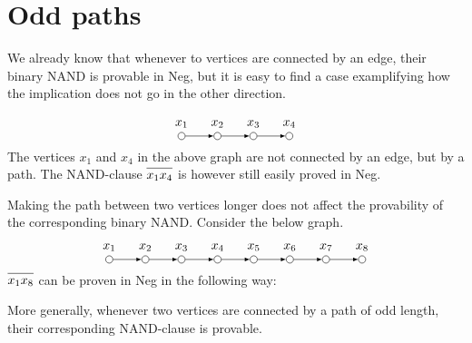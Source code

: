 \section{Odd paths}
\label{sec:Odd paths}
We already know that whenever to vertices are connected by an edge, their binary NAND is provable in Neg, but it is easy to find a case examplifying how the implication does not go in the other direction.

\[
  \begin{tikzpicture}
    [
    point/.style={circle,draw,inner sep=0pt,minimum size=2mm},
    collection/.style={thick,rectangle,draw,inner sep=0pt,minimum height=14mm, minimum width= 9mm}
    ]
    \node (1) at (0,1) [point,label=above:$x_1$] {};
    \node (2) at (1,1) [point,label=above:$x_2$] {};
    \node (3) at (2,1) [point,label=above:$x_3$] {};
    \node (4) at (3,1) [point,label=above:$x_4$] {};
    \draw [-latex] (1) to (2);
    \draw [-latex] (2) to (3);
    \draw [-latex] (3) to (4);
  \end{tikzpicture}
\]
The vertices $x_1$ and $x_4$ in the above graph are not connected by an edge, but by a path.
The NAND-clause $\ol{x_1x_4}$ is however still easily proved in Neg.
\begin{prooftree*}
\end{prooftree*}
Making the path between two vertices longer does not affect the provability of the corresponding binary NAND.
Consider the below graph.
\[
  \begin{tikzpicture}
    [
    point/.style={circle,draw,inner sep=0pt,minimum size=2mm},
    collection/.style={thick,rectangle,draw,inner sep=0pt,minimum height=14mm, minimum width= 9mm}
    ]
    \node (1) at (0,1) [point,label=above:$x_1$] {};
    \node (2) at (1,1) [point,label=above:$x_2$] {};
    \node (3) at (2,1) [point,label=above:$x_3$] {};
    \node (4) at (3,1) [point,label=above:$x_4$] {};
    \node (5) at (4,1) [point,label=above:$x_5$] {};
    \node (6) at (5,1) [point,label=above:$x_6$] {};
    \node (7) at (6,1) [point,label=above:$x_7$] {};
    \node (8) at (7,1) [point,label=above:$x_8$] {};
    \draw [-latex] (1) to (2);
    \draw [-latex] (2) to (3);
    \draw [-latex] (3) to (4);
    \draw [-latex] (4) to (5);
    \draw [-latex] (5) to (6);
    \draw [-latex] (6) to (7);
    \draw [-latex] (7) to (8);
  \end{tikzpicture}
\]
$\ol{x_1x_8}$ can be proven in Neg in the following way:
\begin{prooftree*}
\end{prooftree*}
More generally, whenever two vertices are connected by a path of odd length, their corresponding NAND-clause is provable.
